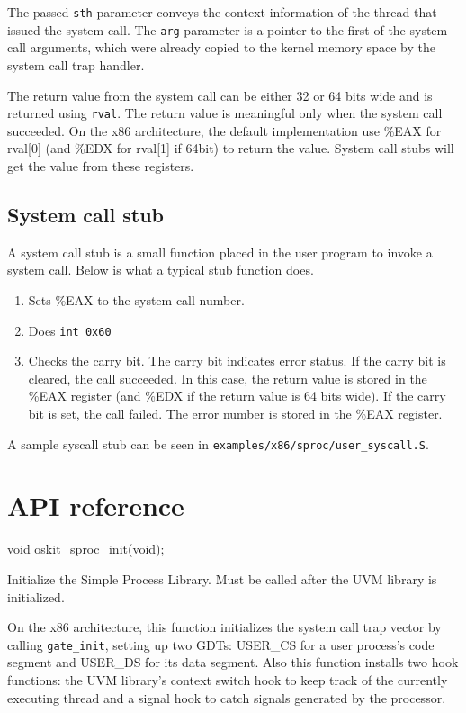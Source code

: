 The passed \texttt{sth} parameter conveys the context information of the thread
that issued the system call.  The {\tt arg} parameter is a pointer to the first
of the system call arguments, which were already copied to the kernel memory
space by the system call trap handler.

The return value from the system call can be either 32 or 64 bits
wide and is returned using {\tt rval}.  The return value is meaningful only
when the system call succeeded.  On the x86 architecture, the default
implementation use \%EAX for rval[0] (and \%EDX for rval[1] if 64bit)
to return the value.  System call stubs will get the value from these
registers.

\subsection{System call stub}
\label{sproc-stub}
A system call stub is a small function placed in the user program to invoke
a system call.  Below is what a typical stub function does.

\begin{enumerate}
\item Sets \%EAX to the system call number.

\item Does \texttt{int 0x60}

\item Checks the carry bit.  The carry bit indicates error status.
If the carry bit is
cleared, the call succeeded.
In this case, the return value is stored in the \%EAX
register (and \%EDX if the return value is 64 bits wide).  If the carry
bit is set, the call failed.  The error number is stored in the \%EAX
register.
\end{enumerate}

A sample syscall stub
can be seen in \texttt{examples/x86/sproc/user_syscall.S}.

\section{API reference}

\begin{apisyn}

        \funcproto void            oskit_sproc_init(void);
\end{apisyn}
\begin{apidesc}
        Initialize the Simple Process Library.  Must be called after
        the UVM library is initialized.  

        On the x86 architecture, this function initializes the system call
        trap vector by calling \texttt{gate_init}, setting up two GDTs:
        USER_CS for a user process's code segment and USER_DS for its data
        segment.  Also this function installs two hook functions: the UVM
        library's context switch hook to keep track of the currently
        executing thread and a signal hook to catch signals generated
        by the processor.
\end{apidesc}

